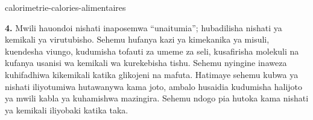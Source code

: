 \begin{exo}{calorimetrie-calories-alimentaires}
\begin{solution}
\textbf{4.} Mwili hauondoi nishati inaposemwa ``unaitumia''; hubadilisha nishati ya kemikali ya virutubisho. Sehemu hufanya kazi ya kimekanika ya misuli, kuendesha viungo, kudumisha tofauti za umeme za seli, kusafirisha molekuli na kufanya usanisi wa kemikali wa kurekebisha tishu. Sehemu nyingine inaweza kuhifadhiwa kikemikali katika glikojeni na mafuta. Hatimaye sehemu kubwa ya nishati iliyotumiwa hutawanywa kama joto, ambalo husaidia kudumisha halijoto ya mwili kabla ya kuhamishwa mazingira. Sehemu ndogo pia hutoka kama nishati ya kemikali iliyobaki katika taka.
\end{solution}
\end{exo}
